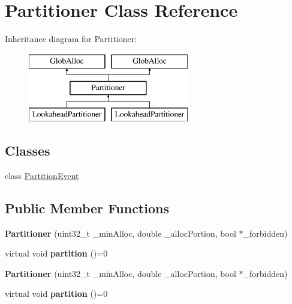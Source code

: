 \hypertarget{classPartitioner}{\section{Partitioner Class Reference}
\label{classPartitioner}
}
Inheritance diagram for Partitioner\-:\begin{figure}[H]
\begin{center}
\leavevmode
\includegraphics[height=3.000000cm]{classPartitioner}
\end{center}
\end{figure}
\subsection*{Classes}
\begin{DoxyCompactItemize}
\item 
class \hyperlink{classPartitioner_1_1PartitionEvent}{Partition\-Event}
\end{DoxyCompactItemize}
\subsection*{Public Member Functions}
\begin{DoxyCompactItemize}
\item 
\hypertarget{classPartitioner_a2a1e8ca43b42e3db3dc0575ef26cf7de}{{\bfseries Partitioner} (uint32\-\_\-t \-\_\-min\-Alloc, double \-\_\-alloc\-Portion, bool $\ast$\-\_\-forbidden)}\label{classPartitioner_a2a1e8ca43b42e3db3dc0575ef26cf7de}

\item 
\hypertarget{classPartitioner_a7d1789d773152e79142ce132ccd860a7}{virtual void {\bfseries partition} ()=0}\label{classPartitioner_a7d1789d773152e79142ce132ccd860a7}

\item 
\hypertarget{classPartitioner_a2a1e8ca43b42e3db3dc0575ef26cf7de}{{\bfseries Partitioner} (uint32\-\_\-t \-\_\-min\-Alloc, double \-\_\-alloc\-Portion, bool $\ast$\-\_\-forbidden)}\label{classPartitioner_a2a1e8ca43b42e3db3dc0575ef26cf7de}

\item 
\hypertarget{classPartitioner_a7d1789d773152e79142ce132ccd860a7}{virtual void {\bfseries partition} ()=0}\label{classPartitioner_a7d1789d773152e79142ce132ccd860a7}

\end{DoxyCompactItemize}
